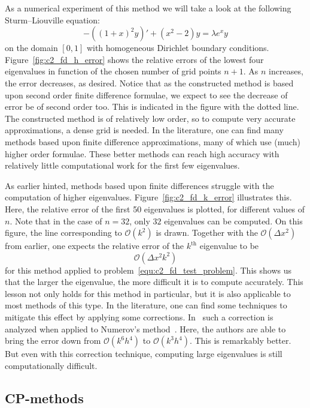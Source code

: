 As a numerical experiment of this method we will take a look at the following Sturm--Liouville equation:
\begin{equation}\label{equ:c2_fd_test_problem}
    -\left((1+x)^2 y \right)' + (x^2 - 2) y = \lambda e^x y
\end{equation}
on the domain $[0, 1]$ with homogeneous Dirichlet boundary conditions. Figure~\ref{fig:c2_fd_h_error} shows the relative errors of the lowest four eigenvalues in function of the chosen number of grid points $n+1$. As $n$ increases, the error decreases, as desired. Notice that as the constructed method is based upon second order finite difference formulae, we expect to see the decrease of error be of second order too. This is indicated in the figure with the dotted line. The constructed method is of relatively low order, so to compute very accurate approximations, a dense grid is needed. In the literature, one can find many methods based upon finite difference approximations, many of which use (much) higher order formulae. These better methods can reach high accuracy with relatively little computational work for the first few eigenvalues.

As earlier hinted, methods based upon finite differences struggle with the computation of higher eigenvalues. Figure~\ref{fig:c2_fd_k_error} illustrates this. Here, the relative error of the first 50 eigenvalues is plotted, for different values of $n$. Note that in the case of $n = 32$, only $32$ eigenvalues can be computed. On this figure, the line corresponding to $\mathcal{O}(k^2)$ is drawn. Together with the $\mathcal{O}(\Delta x^2)$ from earlier, one expects the relative error of the $k^\text{th}$ eigenvalue to be
$$
    \mathcal{O}(\Delta x^2 k^2)
$$
for this method applied to problem~\eqref{equ:c2_fd_test_problem}. This shows us that the larger the eigenvalue, the more difficult it is to compute accurately. This lesson not only holds for this method in particular, but it is also applicable to most methods of this type. In the literature, one can find some techniques to mitigate this effect by applying some corrections. In~\cite{andrew_correction_1985} such a correction is analyzed when applied to Numerov's method~\cite{noumerov_method_1924}. Here, the authors are able to bring the error down from $\mathcal{O}(k^6 h^4)$ to $\mathcal{O}(k^3 h^4)$. This is remarkably better. But even with this correction technique, computing large eigenvalues is still computationally difficult.

\subsection{CP-methods}

